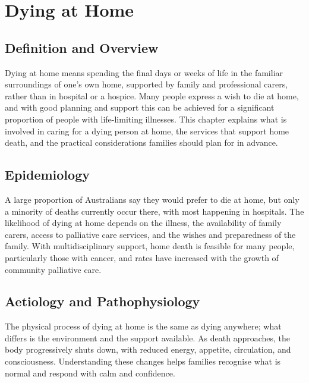 \chapter{Dying at Home}

\section*{Definition and Overview}
Dying at home means spending the final days or weeks of life in the familiar surroundings of one's own home, supported by family and professional carers, rather than in hospital or a hospice. Many people express a wish to die at home, and with good planning and support this can be achieved for a significant proportion of people with life-limiting illnesses. This chapter explains what is involved in caring for a dying person at home, the services that support home death, and the practical considerations families should plan for in advance.

\section*{Epidemiology}
A large proportion of Australians say they would prefer to die at home, but only a minority of deaths currently occur there, with most happening in hospitals. The likelihood of dying at home depends on the illness, the availability of family carers, access to palliative care services, and the wishes and preparedness of the family. With multidisciplinary support, home death is feasible for many people, particularly those with cancer, and rates have increased with the growth of community palliative care.

\section*{Aetiology and Pathophysiology}
The physical process of dying at home is the same as dying anywhere; what differs is the environment and the support available. As death approaches, the body progressively shuts down, with reduced energy, appetite, circulation, and consciousness. Understanding these changes helps families recognise what is normal and respond with calm and confidence.

